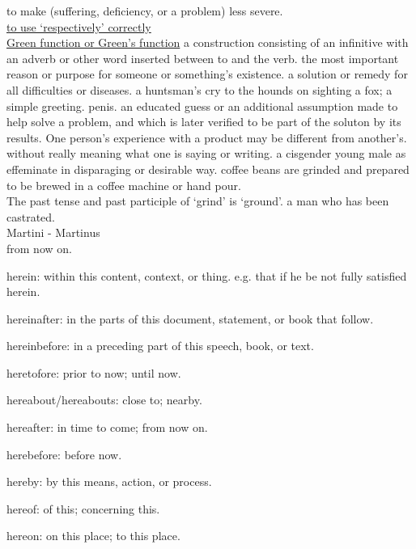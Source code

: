 \documentclass[hidelinks]{ctexart}
\begin{document}

 to make (suffering, deficiency, or a problem) less severe.
\\
\href{https://www.google.com/amp/s/www.internationalscienceediting.com/how-to-use-respectively-correctly/amp/}{to use `respectively' correctly}\\
\href{https://www.nature.com/articles/nphys411}{Green function or Green's function}
 a construction consisting of an infinitive with an adverb or other word inserted between to and the verb.
 the most important reason or purpose for someone or something's existence.
 a solution or remedy for all difficulties or diseases.
 a huntsman's cry to the hounds on sighting a fox; a simple greeting.
 penis.
 an educated guess or an additional assumption made to help solve a problem, and which is later verified to be part of the soluton by its results.
 One person's experience with a product may be different from another's.
 without really meaning what one is saying or writing.
 a cisgender young male as effeminate in disparaging or desirable way.
 coffee beans are grinded and prepared to be brewed in a coffee machine or hand pour.
\\
The past tense and past participle of `grind' is `ground'.
 a man who has been castrated.
\\
Martini - Martinus\\
 from now on.
\begin{citemize}
    \item herein: within this content, context, or thing. e.g. that if he be not fully satisfied herein.
    \item hereinafter: in the parts of this document, statement, or book that follow.
    \item hereinbefore: in a preceding part of this speech, book, or text.
    \item heretofore: prior to now; until now.
    \item hereabout/hereabouts: close to; nearby.
    \item hereafter: in time to come; from now on.
    \item herebefore: before now.
    \item hereby: by this means, action, or process.
    \item hereof: of this; concerning this.
    \item hereon: on this place; to this place.
\end{citemize}
\end{document}
